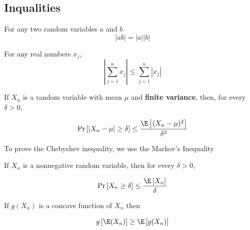 \documentclass[english,12pt]{book}\usepackage[]{graphicx}\usepackage[]{xcolor}
\begin{document}
\begin{subappendices}
 \section{Inqualities}\label{appendix-inequalities}

\begin{definition}\label{def:abs-multiplicativity}
For any two random variables $a$ and $b$
\begin{equation}
\left|ab\right| = \left|a\right|\left|b\right|
\end{equation}
\end{definition}

\begin{definition}\label{def:triangle-inequality}
For any real numbers $x_j$, 
\begin{equation}
  \left|\sum_{j= 1}^n x_j\right| \leq \sum_{j = 1}^n \left|x_j\right|
\end{equation}
\end{definition}

\begin{definition}\label{definition:chebyshev_ineq}
	 If $X_n$ is a random variable with mean $\mu$ and \textbf{finite variance}, then, for every $\delta > 0$,
	 
	 \begin{equation*}
	 \Pr\left[\left| X_n - \mu\right|\geq \delta \right]\leq \frac{\E\left[(X_n - \mu)^2\right]}{\delta ^2}
	 \end{equation*}
\end{definition}

To prove the Chebyshev inequality, we use the Markov's Inequality

\begin{definition}\label{definition:chebyshev_ineq}
	 If $X_n$ is a nonnegative random variable, then for every $\delta > 0$,
	 
	 \begin{equation*}
	 \Pr\left[X_n \geq \delta \right]\leq \frac{\E\left[X_n\right]}{\delta}
	 \end{equation*}
\end{definition}

\begin{definition}\label{theorem:Jansen-Inequality}
If $g(X_n)$ is a concave function of $X_n$ then

\begin{equation*}
  g\left[\E(X_n)\right] \geq \E\left[g(X_n)\right]
\end{equation*}
\end{definition}


\end{subappendices}
\end{document}
